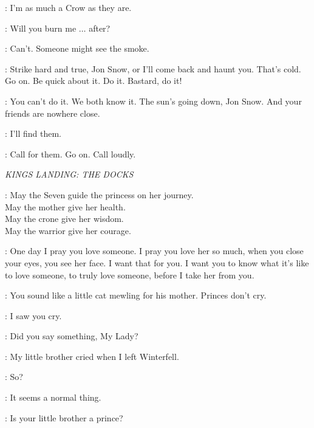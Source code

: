 \JON: I'm as much a Crow as they are. 

\YGRITTE: Will you burn me $\ldots$ after? 

\JON: Can't. Someone might see the smoke. 

\YGRITTE: Strike hard and true, Jon Snow, or I'll come back and haunt you. That's cold. Go on. Be quick about it. Do it. Bastard, do it! 


\YGRITTE: You can't do it. We both know it. The sun's going down, Jon Snow. And your friends are nowhere close. 

\JON: I'll find them. 

\YGRITTE: Call for them. Go on. Call loudly. 


\scene

\textit{KINGS LANDING: THE DOCKS} 


\HIGHSEPTON: May the Seven guide the princess on her journey.\\
May the mother give her health.\\
May the crone give her wisdom.\\
May the warrior give her courage.

\CERSEI:  One day I pray you love someone. I pray you love her so much, when you close your eyes, you see her face. I want that for you. I want you to know what it's like to love someone, to truly love someone, before I take her from you.


\JOFFREY:  You sound like a little cat mewling for his mother. Princes don't cry. 

\SANSA: I saw you cry. 

\JOFFREY: Did you say something, My Lady? 

\SANSA: My little brother cried when I left Winterfell. 

\JOFFREY: So? 

\SANSA: It seems a normal thing. 

\JOFFREY: Is your little brother a prince? 

